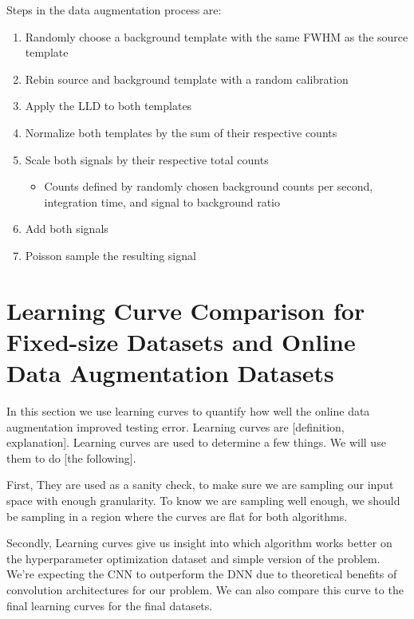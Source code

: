Steps in the data augmentation process are:
\begin{enumerate}
  \item Randomly choose a background template with the same FWHM as the source template
  \item Rebin source and background template with a random calibration
  \item Apply the LLD to both templates
  \item Normalize both templates by the sum of their respective counts 
  \item Scale both signals by their respective total counts
  \begin{itemize}
     \item Counts defined by randomly chosen background counts per second, integration time, and signal to background ratio
   \end{itemize}
  \item Add both signals 
  \item Poisson sample the resulting signal
\end{enumerate}


\section{Learning Curve Comparison for Fixed-size Datasets and Online Data Augmentation Datasets}

In this section we use learning curves to quantify how well the online data augmentation improved testing error. Learning curves are [definition, explanation]. Learning curves are used to determine a few things. We will use them to do [the following].

First, They are used as a sanity check, to make sure we are sampling our input space with enough granularity. To know we are sampling well enough, we should be sampling in a region where the curves are flat for both algorithms.

Secondly, Learning curves give us insight into which algorithm works better on the hyperparameter optimization dataset and simple version of the problem. We're expecting the CNN to outperform the DNN due to theoretical benefits of convolution architectures for our problem. We can also compare this curve to the final learning curves for the final datasets.


